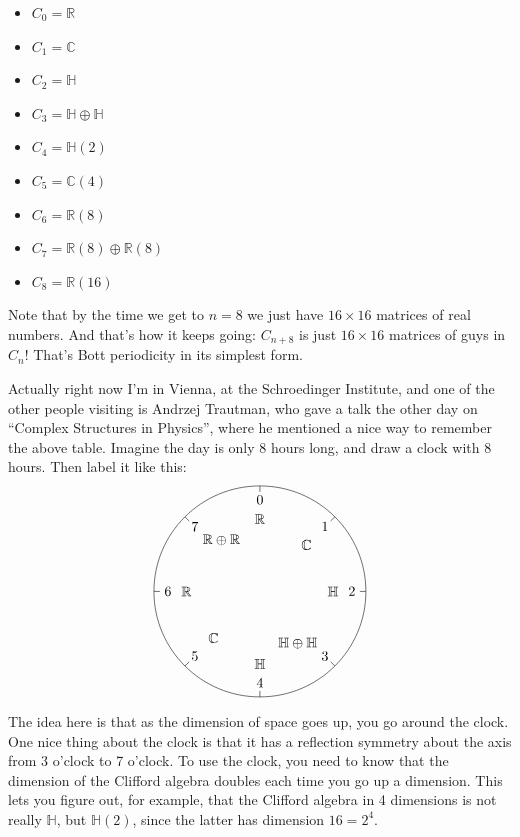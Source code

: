 \documentclass{article}
\def\tightlist{}
\begin{document}
\begin{itemize}
\tightlist
\item
  \(C_0 = \mathbb{R}\)
\item
  \(C_1 = \mathbb{C}\)
\item
  \(C_2 = \mathbb{H}\)
\item
  \(C_3 = \mathbb{H}\oplus\mathbb{H}\)
\item
  \(C_4 = \mathbb{H}(2)\)
\item
  \(C_5 = \mathbb{C}(4)\)
\item
  \(C_6 = \mathbb{R}(8)\)
\item
  \(C_7 = \mathbb{R}(8)\oplus\mathbb{R}(8)\)
\item
  \(C_8 = \mathbb{R}(16)\)
\end{itemize}

Note that by the time we get to \(n = 8\) we just have \(16\times16\)
matrices of real numbers. And that's how it keeps going: \(C_{n+8}\) is
just \(16\times16\) matrices of guys in \(C_n\)! That's Bott periodicity
in its simplest form.

Actually right now I'm in Vienna, at the Schroedinger Institute, and one
of the other people visiting is Andrzej Trautman, who gave a talk the
other day on ``Complex Structures in Physics'', where he mentioned a
nice way to remember the above table. Imagine the day is only 8 hours
long, and draw a clock with 8 hours. Then label it like this: \[
  \begin{tikzpicture}
    \draw (0,0) circle[radius=2.65cm];
    \node[label=below:{$\mathbb{R}$}] at (90:2.3) {0};
    \node[label=below left:{$\mathbb{C}$}] at (45:2.3) {1};
    \node[label=left:{$\mathbb{H}$}] at (0:2.3) {2};
    \node[label={[label distance=-2mm]above left:{$\mathbb{H}\oplus\mathbb{H}$}}] at (-45:2.3) {3};
    \node[label=above:{$\mathbb{H}$}] at (-90:2.3) {4};
    \node[label=above right:{$\mathbb{C}$}] at (-135:2.3) {5};
    \node[label=right:{$\mathbb{R}$}] at (180:2.3) {6};
    \node[label={[label distance=-2mm]below right:{$\mathbb{R}\oplus\mathbb{R}$}}] at (135:2.3) {7};
    \foreach \a in {0,45,90,135,180,-135,-90,-45}
      \draw (\a:2.5) to (\a:2.65);
  \end{tikzpicture}
\] The idea here is that as the dimension of space goes up, you go
around the clock. One nice thing about the clock is that it has a
reflection symmetry about the axis from 3 o'clock to 7 o'clock. To use
the clock, you need to know that the dimension of the Clifford algebra
doubles each time you go up a dimension. This lets you figure out, for
example, that the Clifford algebra in 4 dimensions is not really
\(\mathbb{H}\), but \(\mathbb{H}(2)\), since the latter has dimension
\(16 = 2^4\).
\end{document}
